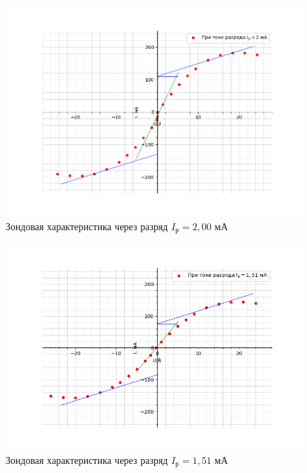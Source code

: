 \documentclass[a4paper,12pt]{article}
\begin{document}
\FloatBarrier
\begin{figure}[h]
	\centering
	\includegraphics[scale=0.9]{vah-2ma.png}
	\caption{Зондовая характеристика через разряд $I_{\text{р}} = 2,00$ мА}
    \label{vah-2}
\end{figure}
\FloatBarrier
\begin{figure}[h]
	\centering
	\includegraphics[scale=0.9]{vah-151ma.png}
	\caption{Зондовая характеристика через разряд $I_{\text{р}} = 1,51$ мА}
    \label{vah-151}
\end{figure}
\FloatBarrier
\end{document}
